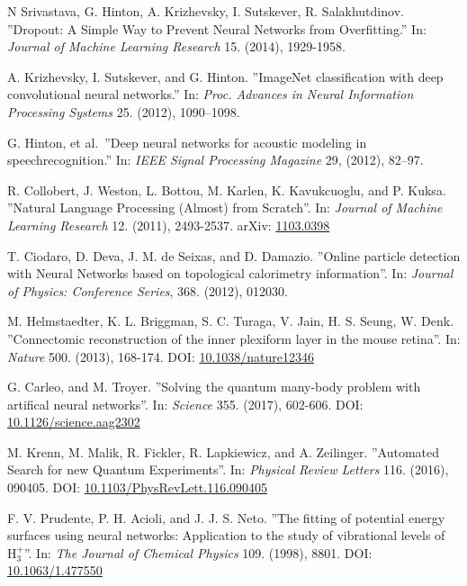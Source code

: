 \documentclass[twoside,english]{uiofysmaster}
\begin{document}
\begin{thebibliography}{56}
 N Srivastava, G. Hinton, A. Krizhevsky, I. Sutskever, R. Salakhutdinov. 
 ''Dropout: A Simple Way to Prevent Neural Networks from Overfitting.''
 In: \textit{Journal of Machine Learning Research} 15. (2014), 1929-1958. 
 
 A. Krizhevsky, I. Sutskever, and G. Hinton.
 ''ImageNet classification with deep
 convolutional neural networks.'' 
 In: \textit{Proc. Advances in Neural Information Processing Systems} 25. (2012), 1090–1098.
 
 G. Hinton, et al.\ 
 ''Deep neural networks for acoustic modeling in speechrecognition.'' 
 In: \textit{IEEE Signal Processing Magazine} 29, (2012), 82–97.
 
 R. Collobert, J. Weston, L. Bottou, M. Karlen, K. Kavukcuoglu, and P. Kuksa. 
 ''Natural Language Processing (Almost) from Scratch''.
 In: \textit{Journal of Machine Learning Research} 12. (2011), 2493-2537. 
 arXiv: \href{https://arxiv.org/abs/1103.0398}{1103.0398}
 
 T. Ciodaro, D. Deva, J. M. de Seixas, and D. Damazio. 
 ''Online particle detection with Neural Networks based on topological calorimetry information''. 
 In: \textit{Journal of Physics: Conference Series}, 368. (2012), 012030. 
 
 M. Helmstaedter, K. L. Briggman, S. C. Turaga, V. Jain, H. S. Seung, W. Denk. 
 ''Connectomic reconstruction of the inner plexiform layer in the mouse retina''. 
 In: \textit{Nature} 500. (2013), 168-174. 
 DOI: \href{http://doi.org/10.1038/nature12346}{10.1038/nature12346}
 
 G. Carleo, and M. Troyer. 
 ''Solving the quantum many-body problem with artifical neural networks''. 
 In: \textit{Science} 355. (2017), 602-606. 
 DOI: \href{http://doi.org/10.1126/science.aag2302}{10.1126/science.aag2302}
 
 M. Krenn, M. Malik, R. Fickler, R. Lapkiewicz, and A. Zeilinger. 
 ''Automated Search for new Quantum Experiments''. 
 In: \textit{Physical Review Letters} 116. (2016), 090405. 
 DOI: \href{http://doi.org/10.1103/PhysRevLett.116.090405}{10.1103/PhysRevLett.116.090405}
 
 F. V. Prudente, P. H. Acioli, and J. J. S. Neto. 
 ''The fitting of potential energy surfaces using neural networks: Application to the study of 
 vibrational levels of $\mathrm{H}_3^+$''. 
 In: \textit{The Journal of Chemical Physics} 109. (1998), 8801. 
 DOI: \href{http://dx.doi.org/10.1063/1.477550}{10.1063/1.477550}
 

\end{thebibliography}
\end{document}
